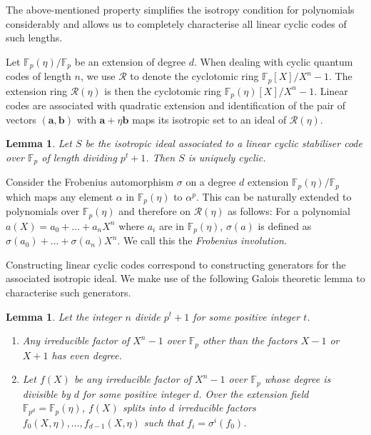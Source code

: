 \documentclass[conference]{IEEEtran}
\renewcommand{\=}{\approx}
\newcommand{\Va}{\mathbf{a}}
\newcommand{\Vb}{\mathbf{b}}
\newcommand{\R}{\mathcal{R}}
\newcommand{\Ra}{\mathcal{R}(\eta)}
\newtheorem{lemma}[theorem]{Lemma} \newtheorem{claim}[theorem]{Claim}
\begin{document}
The above-mentioned property simplifies the isotropy condition for polynomials
considerably and allows us to completely characterise all linear
cyclic codes of such lengths.

Let $\mathbb{F}_p(\eta)/\mathbb{F}_p$ be an extension of degree $d$. 
When dealing with cyclic
quantum codes of length $n$, we use $\R$ to denote the cyclotomic ring
$\mathbb{F}_p[X]/X^n -1$. The extension ring $\Ra$ is then the
cyclotomic ring $\mathbb{F}_{p}(\eta)[X]/X^n -1$. Linear codes are
associated with quadratic extension and identification of the pair of
vectors $(\Va,\Vb)$ with $\Va+\eta \Vb$ maps its isotropic set to an ideal
of $\Ra$.



\begin{lemma}\label{lem:cyclic-linear}
  Let $S$ be the isotropic ideal associated to a linear cyclic
  stabiliser code over $\mathbb{F}_p$ of length dividing $p^t+1$. Then $S$ is
  uniquely cyclic.
\end{lemma}



Consider the Frobenius automorphism $\sigma$ on a degree $d$ extension
$\mathbb{F}_p(\eta)/\mathbb{F}_p$ which maps any element $\alpha$ in
 $\mathbb{F}_p(\eta)$ to $\alpha^p$. This can be naturally
 extended to
polynomials over $\mathbb{F}_p(\eta)$ and therefore on $\Ra$ as
follows: For a polynomial $a(X) = a_0 + \ldots + a_n X^n$ where $a_i$
are in $\mathbb{F}_p(\eta)$, $\sigma(a)$ is defined as $\sigma(a_0) +
\ldots + \sigma(a_n) X^n$. We call this the \emph{Frobenius
  involution}.

Constructing linear cyclic codes correspond to constructing generators
for the associated isotropic ideal. We make use of the following
Galois theoretic lemma to characterise such generators.

\begin{lemma}\label{lem:degree} 
  Let the integer $n$ divide $p^t+1$ for some positive integer $t$. 
\begin{enumerate}
\item Any irreducible factor of $X^{n} -1$ over
  $\mathbb{F}_p$ other than the factors $X -1$ or $X+1$ has even degree.
\item Let $f(X)$ be any irreducible factor of $X^n-1$ over $\mathbb{F}_p$ whose degree is divisible by $d$ for some positive integer $d$. Over the extension field $\mathbb{F}_{p^d}=\mathbb{F}_p(\eta)$, $f(X)$ splits into $d$ irreducible factors $f_0(X,\eta), \ldots, f_{d-1}(X,\eta)$  such that $f_i = \sigma^i(f_0)$.
\end{enumerate}
\end{lemma}
\end{document}
